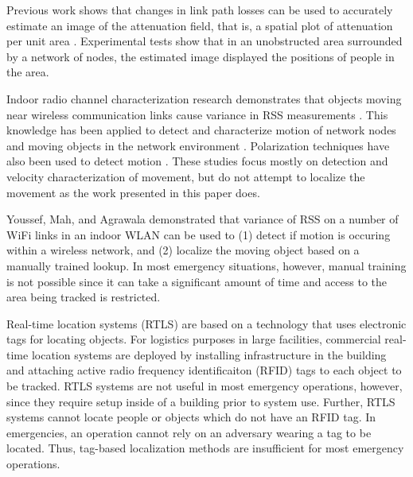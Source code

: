 \documentclass[journal]{IEEEtran}
\begin{document}
Previous work shows that changes in link path losses can be used to accurately estimate an image of the attenuation field, that is, a spatial plot of attenuation per unit area \cite{Wilson09a}.  Experimental tests show that in an unobstructed area surrounded by a network of nodes, the estimated image displayed the positions of people in the area.

Indoor radio channel characterization research demonstrates that objects moving near wireless communication links cause variance in RSS measurements \cite{Bultitude87}. This knowledge has been applied to detect and characterize motion of network nodes and moving objects in the network environment \cite{Woyach06}. Polarization techniques have also been used to detect motion \cite{Pratt08}. These studies focus mostly on detection and velocity characterization of movement, but do not attempt to localize the movement as the work presented in this paper does.

Youssef, Mah, and Agrawala \cite{Youssef07} demonstrated that variance of RSS on a number of WiFi links in an indoor WLAN can be used to (1) detect if motion is occuring within a wireless network, and (2) localize the moving object based on a manually trained lookup. In most emergency situations, however, manual training is not possible since it can take a significant amount of time and access to the area being tracked is restricted.

Real-time location systems (RTLS) are based on a technology that uses electronic tags for locating objects. For logistics purposes in large facilities, commercial real-time location systems are deployed by installing infrastructure in the building and attaching active radio frequency identificaiton (RFID) tags to each object to be tracked. RTLS systems are not useful in most emergency operations, however, since they require setup inside of a building prior to system use.  Further, RTLS systems cannot locate people or objects which do not have an RFID tag.  In emergencies, an operation cannot rely on an adversary wearing a tag to be located.  Thus, tag-based localization methods are insufficient for most emergency operations.
\end{document}
